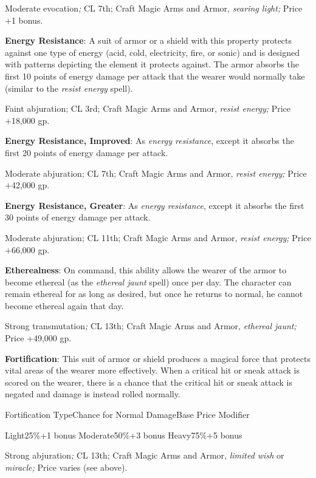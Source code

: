 Moderate evocation\textit{; }CL 7th; Craft Magic Arms and Armor, \textit{searing light; }Price +1 bonus.
				
\textbf{Energy Resistance}: A suit of armor or a shield with this property protects against one type of energy (acid, cold, electricity, fire, or sonic) and is designed with patterns depicting the element it protects against. The armor absorbs the first 10 points of energy damage per attack that the wearer would normally take (similar to the \textit{resist energy }spell).
				
Faint abjuration; CL 3rd; Craft Magic Arms and Armor, \textit{resist energy; }Price +18,000 gp.
				
\textbf{Energy Resistance, Improved}: As \textit{energy resistance}, except it absorbs the first 20 points of energy damage per attack.
				
Moderate abjuration; CL 7th; Craft Magic Arms and Armor, \textit{resist energy; }Price +42,000 gp.
				
\textbf{Energy Resistance, Greater}: As \textit{energy resistance}, except it absorbs the first 30 points of energy damage per attack.
				
Moderate abjuration; CL 11th; Craft Magic Arms and Armor, \textit{resist energy; }Price +66,000 gp.
				
\textbf{Etherealness}: On command, this ability allows the wearer of the armor to become ethereal (as the \textit{ethereal jaunt }spell) once per day. The character can remain ethereal for as long as desired, but once he returns to normal, he cannot become ethereal again that day.
				
Strong transmutation\textit{; }CL 13th; Craft Magic Arms and Armor, \textit{ethereal jaunt; }Price +49,000 gp.
				
\textbf{Fortification}: This suit of armor or shield produces a magical force that protects vital areas of the wearer more effectively. When a critical hit or sneak attack is scored on the wearer, there is a chance that the critical hit or sneak attack is negated and damage is instead rolled normally.


Fortification TypeChance for Normal DamageBase Price Modifier

Light25\%+1 bonus
Moderate50\%+3 bonus
Heavy75\%+5 bonus


				
Strong abjuration\textit{; }CL 13th; Craft Magic Arms and Armor, \textit{limited wish }or \textit{miracle; }Price varies (see above).
				
